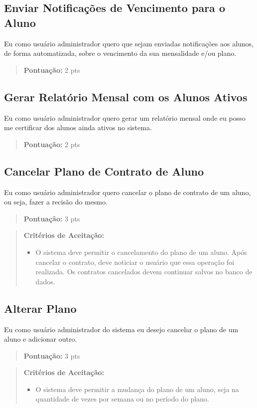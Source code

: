 \subsection[Enviar Notificações de Vencimento para o Aluno]{Enviar Notificações de Vencimento para o Aluno}
Eu como usuário administrador quero que sejam enviadas notificações aos alunos,
de forma automatizada, sobre o vencimento da sua mensalidade e/ou plano.
\begin{quote}
    \textbf{Pontuação:} 2 pts
\end{quote}

\subsection[Gerar Relatório Mensal com os Alunos Ativos]{Gerar Relatório Mensal com os Alunos Ativos}
Eu como usuário administrador quero gerar um relatório mensal onde eu posso me
certificar dos alunos ainda ativos no sistema.
\begin{quote}
    \textbf{Pontuação:} 2 pts
\end{quote}

\subsection[Cancelar Plano de Contrato de Aluno]{Cancelar Plano de Contrato de Aluno}
Eu como usuário administrador quero cancelar o plano de contrato de um aluno,
ou seja, fazer a recisão do mesmo.
\begin{quote}
    \textbf{Pontuação:} 3 pts
\end{quote}
\begin{quote}
\textbf{Critérios de Aceitação:}
    \begin{itemize}
        \item O sistema deve permitir o cancelamento do plano de um aluno. Após cancelar o contrato, deve noticiar o usuário que essa operação foi realizada. Os contratos cancelados devem continuar salvos no banco de dados.
    \end{itemize}
\end{quote}

\subsection[Alterar Plano]{Alterar Plano}
Eu como usuário administrador do sistema eu desejo cancelar o plano de um aluno e adicionar outro.
\begin{quote}
    \textbf{Pontuação:} 3 pts
\end{quote}
\begin{quote}
\textbf{Critérios de Aceitação:}
    \begin{itemize}
        \item O sistema deve permitir a mudança do plano de um aluno, seja na quantidade de vezes por semana ou no período do plano.
    \end{itemize}
\end{quote}


